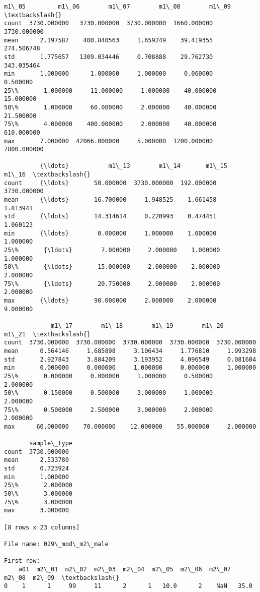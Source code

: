 \documentclass[11pt]{article}
\begin{document}
\begin{Verbatim}[commandchars=\\\{\}]
             m1\_05         m1\_06        m1\_07        m1\_08        m1\_09  \textbackslash{}
count  3730.000000   3730.000000  3730.000000  1660.000000  3730.000000   
mean      2.197587    400.840563     1.659249    39.419355   274.506748   
std       1.775657   1309.034446     0.708888    29.762730   343.035464   
min       1.000000      1.000000     1.000000     0.060000     0.500000   
25\%       1.000000     11.000000     1.000000    40.000000    15.000000   
50\%       1.000000     60.000000     2.000000    40.000000    21.500000   
75\%       4.000000    400.000000     2.000000    40.000000   610.000000   
max       7.000000  42066.000000     5.000000  1200.000000  7800.000000   

          {\ldots}           m1\_13        m1\_14       m1\_15        m1\_16  \textbackslash{}
count     {\ldots}       50.000000  3730.000000  192.000000  3730.000000   
mean      {\ldots}       16.700000     1.948525    1.661458     1.813941   
std       {\ldots}       14.314614     0.220993    0.474451     1.060123   
min       {\ldots}        0.000000     1.000000    1.000000     1.000000   
25\%       {\ldots}        7.000000     2.000000    1.000000     1.000000   
50\%       {\ldots}       15.000000     2.000000    2.000000     2.000000   
75\%       {\ldots}       20.750000     2.000000    2.000000     2.000000   
max       {\ldots}       90.000000     2.000000    2.000000     9.000000   

             m1\_17        m1\_18        m1\_19        m1\_20        m1\_21  \textbackslash{}
count  3730.000000  3730.000000  3730.000000  3730.000000  3730.000000   
mean      0.564146     1.685898     3.106434     1.776810     1.993298   
std       2.927843     3.884209     3.193952     4.096549     0.081604   
min       0.000000     0.000000     1.000000     0.000000     1.000000   
25\%       0.000000     0.000000     1.000000     0.500000     2.000000   
50\%       0.150000     0.500000     3.000000     1.000000     2.000000   
75\%       0.500000     2.500000     3.000000     2.000000     2.000000   
max      60.000000    70.000000    12.000000    55.000000     2.000000   

       sample\_type  
count  3730.000000  
mean      2.533780  
std       0.723924  
min       1.000000  
25\%       2.000000  
50\%       3.000000  
75\%       3.000000  
max       3.000000  

[8 rows x 23 columns]

File name: 029\_mod\_m2\_male

First row: 
    a01  m2\_01  m2\_02  m2\_03  m2\_04  m2\_05  m2\_06  m2\_07  m2\_08  m2\_09  \textbackslash{}
0    1      1     99     11      2      1   10.0      2    NaN   35.0   


\end{Verbatim}
\end{document}
